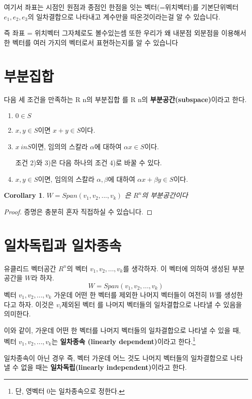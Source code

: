 \documentclass{oblivoir}
\newtheorem{corollary}{Corollary}[theorem]
\newcommand{\onetok}[1]{ {#1}_1, {#1}_2, ... , {#1}_k}
\begin{document}
여기서 좌표는 시점인 원점과 종점인 한점을 잇는 벡터(=위치벡터)를 기본단위벡터 $e_1, e_2, e_3$의 일차결합으로 나타내고 계수만을 따온것이라는걸 알 수 있습니다.

즉 좌표 = 위치벡터 그자체로도 볼수있는셈 또한 우리가 왜 내분점 외분점을 이용해서 한 벡터를 여러 가지의 벡터로서 표현하는지를 알 수 있습니다







\section{부분집합}

\begin{dfn}[부분집합]
다음 세 조건을 만족하는 R n의 부분집합 를 R n의 \textbf{부분공간(subspace)}이라고 한다.
\begin{enumerate}
    \item  $0 \in S$
    \item $x, y \in S$이면 $x + y \in S$이다.
    \item $x \ in S$이면, 임의의 스칼라 $\alpha$에 대하여 $\alpha x \in S$이다.
    
    조건 2)와 3)은 다음 하나의 조건 4)로 바꿀 수 있다.

    \item $x, y \in S$이면, 임의의 스칼라 $\alpha , \beta$에 대하여 $\alpha x + \beta y \in S$이다.
\end{enumerate}
\end{dfn}

\begin{corollary}
    $W = Span(\onetok{v})$ 은 $R^n$의 부분공간이다
\end{corollary}
\begin{proof}
    증명은 충분히 혼자 직접하실 수 있습니다.    
\end{proof}

\section{일차독립과 일차종속}
\begin{dfn}
    
    유클리드 벡터공간 $R^n$의 벡터 $\onetok{v}$를 생각하자. 이 벡터에 의하여 생성된 부분공간을  $W$라 하자.
    \[
        W = Span(\onetok{v})
    \]
    벡터 $\onetok{v}$ 가운데 어떤 한 벡터를 제외한 나머지 벡터들이 여전히 $W$를 생성한다고 하자. 이것은 $v_i$제외된 벡터 를 나머지 벡터들의 일차결합으로 나타낼 수 있음을 의미한다. 
    
    \vspace{0.5cm}
    
    이와 같이, 가운데 어떤 한 벡터를 나머지 벡터들의 일차결합으로 나타낼 수 있을 때, 벡터 $\onetok{v}$는  \textbf{일차종속 (linearly dependent)}이라고 한다.\footnote{단, 영벡터 0는 일차종속으로 정한다.}

    \vspace{0.5cm}

    일차종속이 아닌 경우 즉, 벡터 가운데 어느 것도 나머지 벡터들의 일차결합으로 나타낼 수 없을 때는 \textbf{일차독립(linearly independent)}이라고 한다.
\end{dfn}
\end{document}
